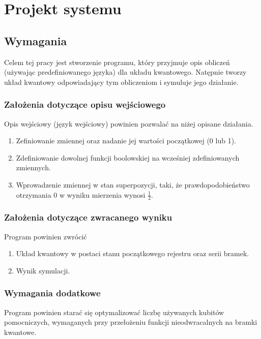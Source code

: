 \chapter{Projekt systemu}
\thispagestyle{chapterBeginStyle}
\label{rozdzial2}

\section{Wymagania}
Celem tej pracy jest stworzenie programu, który przyjmuje opis obliczeń (używając predefiniowanego języka) dla układu kwantowego. Natępnie tworzy układ kwantowy odpowiadający tym obliczeniom i symuluje jego działanie.
\subsection{Założenia dotyczące opisu wejściowego}
Opis wejściowy (język wejściowy) powinien pozwalać na niżej opisane działania.
\begin{enumerate}
    \item Zefiniowanie zmiennej oraz nadanie jej wartości początkowej (0 lub 1).
    \item Zdefiniowanie dowolnej funkcji boolowskiej na wcześniej zdefiniowanych zmiennych.
    \item Wprowadzenie zmiennej w stan superpozycji, taki, że prawdopodobieństwo otrzymania 0 w wyniku mierzenia wynosi $\frac{1}{2}$.
\end{enumerate}
\subsection{Założenia dotyczące zwracanego wyniku}
Program powinien zwrócić
\begin{enumerate}
    \item Układ kwantowy w postaci stanu początkowego rejestru oraz serii bramek.
    \item Wynik symulacji.
\end{enumerate}
\subsection{Wymagania dodatkowe}
Program powinien starać się optymalizować liczbę używanych kubitów pomocniczych, wymaganych przy przełożeniu funkcji nieodwracalnych na bramki kwantowe.
